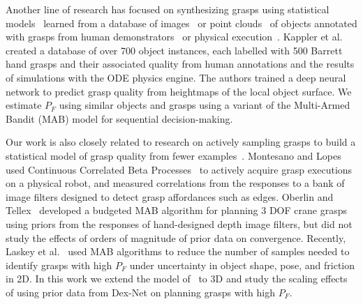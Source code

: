 Another line of research has focused on synthesizing grasps using statistical models~\cite{bohg2014data} learned from a database of images~\cite{lenz2015deep} or point clouds~\cite{detry2013learning, herzog2014learning, zhang2011graspable} of objects annotated with grasps from human demonstrators~\cite{herzog2014learning, lenz2015deep} or physical execution~\cite{herzog2014learning}.
Kappler et al.~\cite{kappler2015leveraging} created a database of over 700 object instances, each labelled with 500 Barrett hand grasps and their associated quality from human annotations and the results of simulations with the ODE physics engine.
The authors trained a deep neural network to predict grasp quality from heightmaps of the local object surface.
We estimate $P_F$ using similar objects and grasps using a variant of the Multi-Armed Bandit (MAB) model for sequential decision-making.

Our work is also closely related to research on actively sampling grasps to build a statistical model of grasp quality from fewer examples~\cite{detry2011learning, kroemer2010combining, salganicoff1996active}.
Montesano and Lopes~\cite{montesano2012active} used Continuous Correlated Beta Processes~\cite{goetschalckx2011continuous} to actively acquire grasp executions on a physical robot, and measured correlations from the responses to a bank of image filters designed to detect grasp affordances such as edges.
Oberlin and Tellex~\cite{oberlin2015autonomously} developed a budgeted MAB algorithm for planning 3 DOF crane grasps using priors from the responses of hand-designed depth image filters, but did not study the effects of orders of magnitude of prior data on convergence.
Recently, Laskey et al.~\cite{laskey2015bandits} used MAB algorithms to reduce the number of samples needed to identify grasps with high $P_F$ under uncertainty in object shape, pose, and friction in 2D.
In this work we extend the model of~\cite{laskey2015bandits} to 3D and study the scaling effects of using prior data from Dex-Net on planning grasps with high $P_F$.


